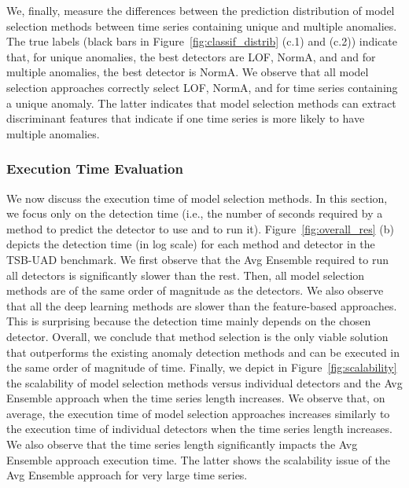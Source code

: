 We, finally, measure the differences between the prediction distribution of model selection methods between time series containing unique and multiple anomalies. The true labels (black bars in Figure~\ref{fig:classif_distrib} (c.1) and (c.2)) indicate that, for unique anomalies, the best detectors are LOF, NormA, and  and for multiple anomalies, the best detector is NormA. We observe that all model selection approaches correctly select LOF, NormA, and  for time series containing a unique anomaly. The latter indicates that model selection methods can extract discriminant features that indicate if one time series is more likely to have multiple anomalies.


\subsubsection{\textbf{Execution Time Evaluation}}

We now discuss the execution time of model selection methods. In this section, we focus only on the detection time (i.e., the number of seconds required by a method to predict the detector to use and to run it). Figure~\ref{fig:overall_res} (b) depicts the detection time (in log scale) for each method and detector in the TSB-UAD benchmark. We first observe that the Avg Ensemble required to run all detectors is significantly slower than the rest. Then, all model selection methods are of the same order of magnitude as the detectors. We also observe that all the deep learning methods are slower than the feature-based approaches. This is surprising because the detection time mainly depends on the chosen detector. Overall, we conclude that method selection is the only viable solution that outperforms the existing anomaly detection methods and can be executed in the same order of magnitude of time.
Finally, we depict in Figure~\ref{fig:scalability} the scalability of model selection methods versus individual detectors and the Avg Ensemble approach when the time series length increases. We observe that, on average, the execution time of model selection approaches increases similarly to the execution time of individual detectors when the time series length increases. We also observe that the time series length significantly impacts the Avg Ensemble approach execution time. The latter shows the scalability issue of the Avg Ensemble approach for very large time series.

